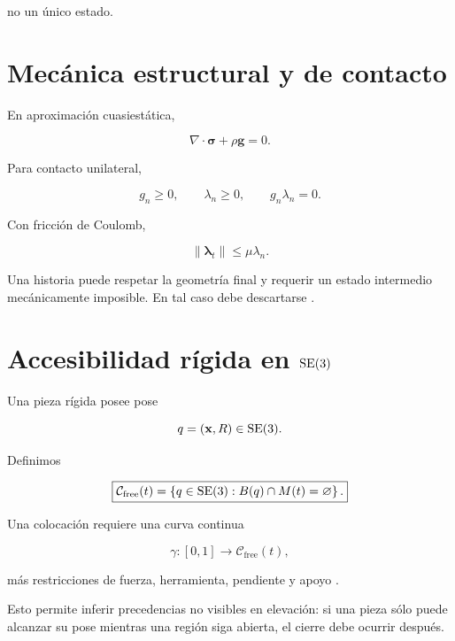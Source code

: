 no un único estado.

\section{Mecánica estructural y de contacto}

En aproximación cuasiestática,

\begin{equation}
\boxed{
\nabla\cdot\bm\sigma
+
\rho\mathbf g
=
0.
}
\end{equation}

Para contacto unilateral,

\begin{equation}
g_n\ge0,
\qquad
\lambda_n\ge0,
\qquad
g_n\lambda_n=0.
\end{equation}

Con fricción de Coulomb,

\begin{equation}
\|\bm\lambda_t\|
\le
\mu\lambda_n.
\end{equation}

Una historia puede respetar la geometría final y requerir un estado intermedio mecánicamente imposible. En tal caso debe descartarse \cite{wriggers2006}.

\section{Accesibilidad rígida en \texorpdfstring{\(\mathrm{SE}(3)\)}{SE(3)}}

Una pieza rígida posee pose

\begin{equation}
q=(\mathbf x,R)\in\mathrm{SE}(3).
\end{equation}

Definimos

\begin{equation}
\boxed{
\mathcal C_{\mathrm{free}}(t)
=
\left\{
q\in\mathrm{SE}(3):
B(q)\cap M(t)=\varnothing
\right\}.
}
\end{equation}

Una colocación requiere una curva continua

\begin{equation}
\gamma:[0,1]\rightarrow\mathcal C_{\mathrm{free}}(t),
\end{equation}

más restricciones de fuerza, herramienta, pendiente y apoyo \cite{lavalle2006}.

Esto permite inferir precedencias no visibles en elevación: si una pieza sólo puede alcanzar su pose mientras una región siga abierta, el cierre debe ocurrir después.

